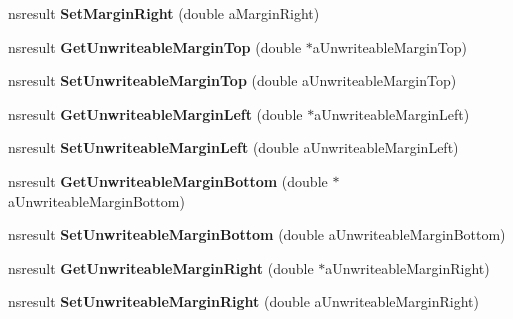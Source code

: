 \begin{DoxyCompactItemize}
nsresult {\bfseries Set\+Margin\+Right} (double a\+Margin\+Right)
\item 
\mbox{\label{interfacens_i_print_settings_abda272f1ca0ef02f4c92a3339bd633e1}} 
nsresult {\bfseries Get\+Unwriteable\+Margin\+Top} (double $\ast$a\+Unwriteable\+Margin\+Top)
\item 
\mbox{\label{interfacens_i_print_settings_ad63c45576ed7d924f61ed3f5677fdf34}} 
nsresult {\bfseries Set\+Unwriteable\+Margin\+Top} (double a\+Unwriteable\+Margin\+Top)
\item 
\mbox{\label{interfacens_i_print_settings_abbad3687d33741b2c5248c2a3c063efc}} 
nsresult {\bfseries Get\+Unwriteable\+Margin\+Left} (double $\ast$a\+Unwriteable\+Margin\+Left)
\item 
\mbox{\label{interfacens_i_print_settings_af4bdf33ffa18d7eb914641c9b5784db5}} 
nsresult {\bfseries Set\+Unwriteable\+Margin\+Left} (double a\+Unwriteable\+Margin\+Left)
\item 
\mbox{\label{interfacens_i_print_settings_a93a7b280d94f0e006ddf5279564a7735}} 
nsresult {\bfseries Get\+Unwriteable\+Margin\+Bottom} (double $\ast$a\+Unwriteable\+Margin\+Bottom)
\item 
\mbox{\label{interfacens_i_print_settings_a374ae12478c205dfd15890c3b2eb515c}} 
nsresult {\bfseries Set\+Unwriteable\+Margin\+Bottom} (double a\+Unwriteable\+Margin\+Bottom)
\item 
\mbox{\label{interfacens_i_print_settings_a461c5eabe12a349efd3679d1c1343227}} 
nsresult {\bfseries Get\+Unwriteable\+Margin\+Right} (double $\ast$a\+Unwriteable\+Margin\+Right)
\item 
\mbox{\label{interfacens_i_print_settings_af280e8db3d9af6ad02cf3565c3dbe5df}} 
nsresult {\bfseries Set\+Unwriteable\+Margin\+Right} (double a\+Unwriteable\+Margin\+Right)
\item 
\mbox{\label{interfacens_i_print_settings_a6094b1ce8800ca2787e9e259ffbcb9f3}} 

\end{DoxyCompactItemize}

